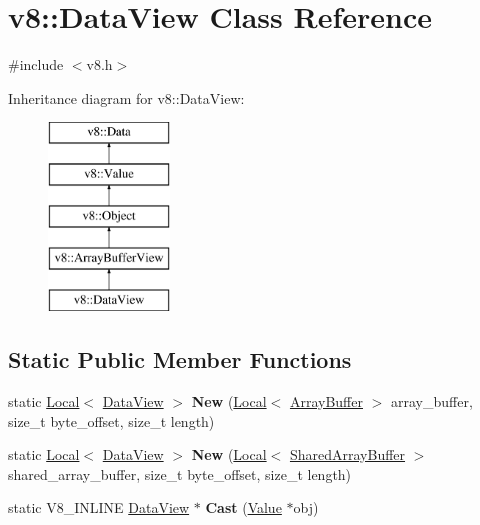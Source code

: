 \hypertarget{classv8_1_1_data_view}{}\section{v8\+:\+:Data\+View Class Reference}
\label{classv8_1_1_data_view}


{\ttfamily \#include $<$v8.\+h$>$}

Inheritance diagram for v8\+:\+:Data\+View\+:\begin{figure}[H]
\begin{center}
\leavevmode
\includegraphics[height=5.000000cm]{classv8_1_1_data_view}
\end{center}
\end{figure}
\subsection*{Static Public Member Functions}
\begin{DoxyCompactItemize}
\item 
static \hyperlink{classv8_1_1_local}{Local}$<$ \hyperlink{classv8_1_1_data_view}{Data\+View} $>$ {\bfseries New} (\hyperlink{classv8_1_1_local}{Local}$<$ \hyperlink{classv8_1_1_array_buffer}{Array\+Buffer} $>$ array\+\_\+buffer, size\+\_\+t byte\+\_\+offset, size\+\_\+t length)\hypertarget{classv8_1_1_data_view_af1853689574fdc56ae787b1113143fef}{}\label{classv8_1_1_data_view_af1853689574fdc56ae787b1113143fef}

\item 
static \hyperlink{classv8_1_1_local}{Local}$<$ \hyperlink{classv8_1_1_data_view}{Data\+View} $>$ {\bfseries New} (\hyperlink{classv8_1_1_local}{Local}$<$ \hyperlink{classv8_1_1_shared_array_buffer}{Shared\+Array\+Buffer} $>$ shared\+\_\+array\+\_\+buffer, size\+\_\+t byte\+\_\+offset, size\+\_\+t length)\hypertarget{classv8_1_1_data_view_aea9fa77f2e68e6c9dde0c9160e494d9c}{}\label{classv8_1_1_data_view_aea9fa77f2e68e6c9dde0c9160e494d9c}

\item 
static V8\+\_\+\+I\+N\+L\+I\+NE \hyperlink{classv8_1_1_data_view}{Data\+View} $\ast$ {\bfseries Cast} (\hyperlink{classv8_1_1_value}{Value} $\ast$obj)\hypertarget{classv8_1_1_data_view_aa97d15fcb28c6c002a52d32877c8fd3a}{}\label{classv8_1_1_data_view_aa97d15fcb28c6c002a52d32877c8fd3a}

\end{DoxyCompactItemize}
